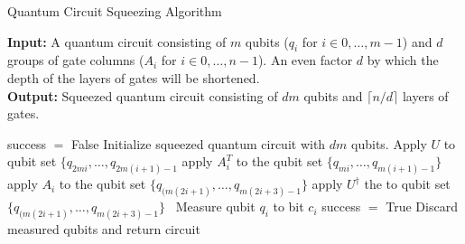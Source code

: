 \documentclass[10pt]{article}
\begin{document}
\begin{algorithm}[H]
\label{alg:qcsa}

\caption{Quantum Circuit Squeezing Algorithm}\label{alg:qcsa}

\hspace*{\algorithmicindent} \textbf{Input:} A quantum circuit consisting of $m$ qubits ($q_i$ for $i\in0,\ldots,m-1$) and $d$ groups of gate columns ($A_i$ for $i\in0,\ldots,n-1$). An even factor $d$ by which the depth of the layers of gates will be shortened. 
\\
\hspace*{\algorithmicindent} \textbf{Output:} Squeezed quantum circuit consisting of $dm$ qubits and $\lceil n/d \rceil$ layers of gates.

\begin{algorithmic}[H]

\State success $=$ False
    \State Initialize squeezed quantum circuit with $dm$ qubits.
        \State Apply $U$ to qubit set $\{q_{2mi},\ldots,q_{2m(i+1)-1}$
    \EndFor
            \State apply $A^T_i$ to the qubit set $\{q_{mi},\ldots,q_{m(i+1)-1}\}$
        \EndIf
            \State apply $A_i$ to the qubit set $\{q_{(m(2i+1)},\ldots,q_{m(2i+3)-1}\}$
        \EndIf
    \EndFor
        \State apply $U^\dagger$ the to qubit set $\{q_{(m(2i+1)},\ldots,q_{m(2i+3)-1}\}$\
    \EndFor
        \State Measure qubit $q_i$ to bit $c_i$
    \EndFor
        \State success $=$ True
        \State Discard measured qubits and return circuit
    \EndIf
\EndWhile

\end{algorithmic}

\end{algorithm}
\end{document}
